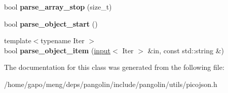 \begin{DoxyCompactItemize}
\item 
bool {\bfseries parse\+\_\+array\+\_\+stop} (size\+\_\+t)\hypertarget{classpangolin_1_1json_1_1null__parse__context_a93ef1fbae52bd2647c0625471dd0ec46}{}\label{classpangolin_1_1json_1_1null__parse__context_a93ef1fbae52bd2647c0625471dd0ec46}

\item 
bool {\bfseries parse\+\_\+object\+\_\+start} ()\hypertarget{classpangolin_1_1json_1_1null__parse__context_aba82f08620faa437902b09ec75e86e62}{}\label{classpangolin_1_1json_1_1null__parse__context_aba82f08620faa437902b09ec75e86e62}

\item 
{\footnotesize template$<$typename Iter $>$ }\\bool {\bfseries parse\+\_\+object\+\_\+item} (\hyperlink{classpangolin_1_1json_1_1input}{input}$<$ Iter $>$ \&in, const std\+::string \&)\hypertarget{classpangolin_1_1json_1_1null__parse__context_a397548466a3b59a02c36a597d866826e}{}\label{classpangolin_1_1json_1_1null__parse__context_a397548466a3b59a02c36a597d866826e}

\end{DoxyCompactItemize}


The documentation for this class was generated from the following file\+:\begin{DoxyCompactItemize}
\item 
/home/gapo/meng/deps/pangolin/include/pangolin/utils/picojson.\+h\end{DoxyCompactItemize}
